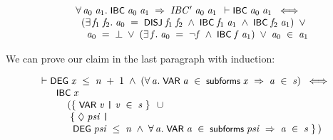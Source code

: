 \documentclass[letterpaper]{article}
\renewcommand{\HOLConst}[1]{{\textsf{\upshape\small #1}}}
\newenvironment{holmath}{\begin{displaymath}\begin{array}{l}}{\end{array}\end{displaymath}\ignorespacesafterend}
\begin{document}
\begin{holmath}
\;\;\;\;\;\HOLSymConst{\HOLTokenForall{}}\HOLBoundVar{a\sb{\mathrm{0}}}\;\HOLBoundVar{a\sb{\mathrm{1}}}.\;\HOLConst{IBC}\;\HOLBoundVar{a\sb{\mathrm{0}}}\;\HOLBoundVar{a\sb{\mathrm{1}}}\;\HOLSymConst{\HOLTokenImp{}}\;\HOLFreeVar{IBC\sp{\prime}}\;\HOLBoundVar{a\sb{\mathrm{0}}}\;\HOLBoundVar{a\sb{\mathrm{1}}}
  \ensuremath{\HOLTokenTurnstile}\HOLConst{IBC}\;\HOLFreeVar{a\sb{\mathrm{0}}}\;\HOLFreeVar{a\sb{\mathrm{1}}}\;\HOLSymConst{\HOLTokenEquiv{}}\\
\;\;\;\;\;\;\;(\HOLSymConst{\HOLTokenExists{}}\HOLBoundVar{f\sb{\mathrm{1}}}\;\HOLBoundVar{f\sb{\mathrm{2}}}.\;\HOLFreeVar{a\sb{\mathrm{0}}}\;\HOLSymConst{=}\;\HOLConst{DISJ}\;\HOLBoundVar{f\sb{\mathrm{1}}}\;\HOLBoundVar{f\sb{\mathrm{2}}}\;\HOLSymConst{\HOLTokenConj{}}\;\HOLConst{IBC}\;\HOLBoundVar{f\sb{\mathrm{1}}}\;\HOLFreeVar{a\sb{\mathrm{1}}}\;\HOLSymConst{\HOLTokenConj{}}\;\HOLConst{IBC}\;\HOLBoundVar{f\sb{\mathrm{2}}}\;\HOLFreeVar{a\sb{\mathrm{1}}})\;\HOLSymConst{\HOLTokenDisj{}}\\
\;\;\;\;\;\;\;\;\;\HOLFreeVar{a\sb{\mathrm{0}}}\;\HOLSymConst{=}\;\HOLSymConst{\ensuremath{\bot}}\;\HOLSymConst{\HOLTokenDisj{}}\;(\HOLSymConst{\HOLTokenExists{}}\HOLBoundVar{f}.\;\HOLFreeVar{a\sb{\mathrm{0}}}\;\HOLSymConst{=}\;\HOLSymConst{\HOLTokenNeg{}}\HOLBoundVar{f}\;\HOLSymConst{\HOLTokenConj{}}\;\HOLConst{IBC}\;\HOLBoundVar{f}\;\HOLFreeVar{a\sb{\mathrm{1}}})\;\HOLSymConst{\HOLTokenDisj{}}\;\HOLFreeVar{a\sb{\mathrm{0}}}\;\HOLSymConst{\HOLTokenIn{}}\;\HOLFreeVar{a\sb{\mathrm{1}}}
\end{holmath}

We can prove our claim in the last paragraph with induction:

\begin{holmath}
  \ensuremath{\HOLTokenTurnstile}\HOLConst{DEG}\;\HOLFreeVar{x}\;\HOLSymConst{\HOLTokenLeq{}}\;\HOLFreeVar{n}\;\HOLSymConst{\ensuremath{+}}\;\HOLNumLit{1}\;\HOLSymConst{\HOLTokenConj{}}\;(\HOLSymConst{\HOLTokenForall{}}\HOLBoundVar{a}.\;\HOLConst{VAR}\;\HOLBoundVar{a}\;\HOLSymConst{\HOLTokenIn{}}\;\HOLConst{subforms}\;\HOLFreeVar{x}\;\HOLSymConst{\HOLTokenImp{}}\;\HOLBoundVar{a}\;\HOLSymConst{\HOLTokenIn{}}\;\HOLFreeVar{s})\;\HOLSymConst{\HOLTokenEquiv{}}\\
\;\;\;\;\;\;\;\HOLConst{IBC}\;\HOLFreeVar{x}\\
\;\;\;\;\;\;\;\;\;\;\;(\HOLTokenLeftbrace{}\HOLConst{VAR}\;\HOLBoundVar{v}\;\HOLTokenBar{}\;\HOLBoundVar{v}\;\HOLSymConst{\HOLTokenIn{}}\;\HOLFreeVar{s}\HOLTokenRightbrace{}\;\HOLSymConst{\HOLTokenUnion{}}\\
\;\;\;\;\;\;\;\;\;\;\;\;\HOLTokenLeftbrace{}\HOLSymConst{\ensuremath{\Diamond}}\;\HOLBoundVar{psi}\;\HOLTokenBar{}\\
\;\;\;\;\;\;\;\;\;\;\;\;\;\HOLConst{DEG}\;\HOLBoundVar{psi}\;\HOLSymConst{\HOLTokenLeq{}}\;\HOLFreeVar{n}\;\HOLSymConst{\HOLTokenConj{}}\;\HOLSymConst{\HOLTokenForall{}}\HOLBoundVar{a}.\;\HOLConst{VAR}\;\HOLBoundVar{a}\;\HOLSymConst{\HOLTokenIn{}}\;\HOLConst{subforms}\;\HOLBoundVar{psi}\;\HOLSymConst{\HOLTokenImp{}}\;\HOLBoundVar{a}\;\HOLSymConst{\HOLTokenIn{}}\;\HOLFreeVar{s}\HOLTokenRightbrace{})
\end{holmath}
\end{document}
